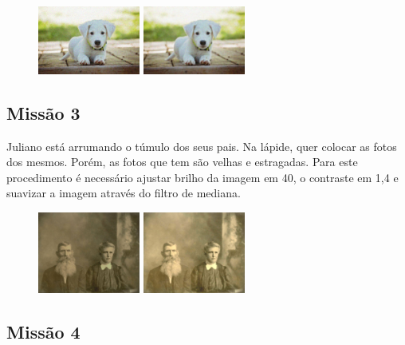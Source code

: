 \documentclass[
	12pt,				%
	oneside,			%
	a4paper,			%
	english,			%
	french,				%
	spanish,			%
	brazil,				%
	]{abntex2}
\begin{document}
\begin{apendicesenv}
\begin{figure}[H]
\centering
\includegraphics[width=0.3\textwidth]{imagens/desafioestudio/mission2_input.jpg}
\includegraphics[width=0.3\textwidth]{imagens/desafioestudio/mission2_output.png}
\end{figure}

\subsection{Missão 3}

Juliano está arrumando o túmulo dos seus pais. Na lápide, quer colocar as fotos dos mesmos. Porém, as fotos que tem são velhas e estragadas. Para este procedimento é necessário ajustar  brilho da imagem em 40, o contraste em 1,4 e suavizar a imagem através do filtro de mediana.

\begin{figure}[H]
\centering
\includegraphics[width=0.3\textwidth]{imagens/desafioestudio/mission3_input.jpg}
\includegraphics[width=0.3\textwidth]{imagens/desafioestudio/mission3_output.png}
\end{figure}

\subsection{Missão 4}


\end{apendicesenv}
\end{document}
